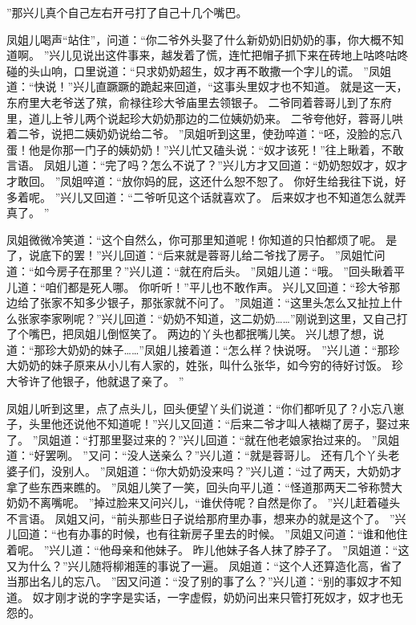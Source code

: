 ”那兴儿真个自己左右开弓打了自己十几个嘴巴。
\par
凤姐儿喝声“站住”，问道：“你二爷外头娶了什么新奶奶旧奶奶的事，你大概不知道啊。
”兴儿见说出这件事来，越发着了慌，连忙把帽子抓下来在砖地上咕咚咕咚碰的头山响，口里说道：“只求奶奶超生，奴才再不敢撒一个字儿的谎。
”凤姐道：“快说！”兴儿直蹶蹶的跪起来回道，“这事头里奴才也不知道。
就是这一天，东府里大老爷送了殡，俞禄往珍大爷庙里去领银子。
二爷同着蓉哥儿到了东府里，道儿上爷儿两个说起珍大奶奶那边的二位姨奶奶来。
二爷夸他好，蓉哥儿哄着二爷，说把二姨奶奶说给二爷。
”凤姐听到这里，使劲啐道：“呸，没脸的忘八蛋！他是你那一门子的姨奶奶！”兴儿忙又磕头说：“奴才该死！”往上瞅着，不敢言语。
凤姐儿道：“完了吗？怎么不说了？”兴儿方才又回道：“奶奶恕奴才，奴才才敢回。
”凤姐啐道：“放你妈的屁，这还什么恕不恕了。
你好生给我往下说，好多着呢。
”兴儿又回道：“二爷听见这个话就喜欢了。
后来奴才也不知道怎么就弄真了。
”\par
凤姐微微冷笑道：“这个自然么，你可那里知道呢！你知道的只怕都烦了呢。
是了，说底下的罢！”兴儿回道：“后来就是蓉哥儿给二爷找了房子。
”凤姐忙问道：“如今房子在那里？”兴儿道：“就在府后头。
”凤姐儿道：“哦。
”回头瞅着平儿道：“咱们都是死人哪。
你听听！”平儿也不敢作声。
兴儿又回道：“珍大爷那边给了张家不知多少银子，那张家就不问了。
”凤姐道：“这里头怎么又扯拉上什么张家李家咧呢？”兴儿回道：“奶奶不知道，这二奶奶……”刚说到这里，又自己打了个嘴巴，把凤姐儿倒怄笑了。
两边的丫头也都抿嘴儿笑。
兴儿想了想，说道：“那珍大奶奶的妹子……”凤姐儿接着道：“怎么样？快说呀。
”兴儿道：“那珍大奶奶的妹子原来从小儿有人家的，姓张，叫什么张华，如今穷的待好讨饭。
珍大爷许了他银子，他就退了亲了。
”\par
凤姐儿听到这里，点了点头儿，回头便望丫头们说道：“你们都听见了？小忘八崽子，头里他还说他不知道呢！”兴儿又回道：“后来二爷才叫人裱糊了房子，娶过来了。
”凤姐道：“打那里娶过来的？”兴儿回道：“就在他老娘家抬过来的。
”凤姐道：“好罢咧。
”又问：“没人送亲么？”兴儿道：“就是蓉哥儿。
还有几个丫头老婆子们，没别人。
”凤姐道：“你大奶奶没来吗？”兴儿道：“过了两天，大奶奶才拿了些东西来瞧的。
”凤姐儿笑了一笑，回头向平儿道：“怪道那两天二爷称赞大奶奶不离嘴呢。
”掉过脸来又问兴儿，“谁伏侍呢？自然是你了。
”兴儿赶着碰头不言语。
凤姐又问，“前头那些日子说给那府里办事，想来办的就是这个了。
”兴儿回道：“也有办事的时候，也有往新房子里去的时候。
”凤姐又问道：“谁和他住着呢。
”兴儿道：“他母亲和他妹子。
昨儿他妹子各人抹了脖子了。
”凤姐道：“这又为什么？”兴儿随将柳湘莲的事说了一遍。
凤姐道：“这个人还算造化高，省了当那出名儿的忘八。
”因又问道：“没了别的事了么？”兴儿道：“别的事奴才不知道。
奴才刚才说的字字是实话，一字虚假，奶奶问出来只管打死奴才，奴才也无怨的。
